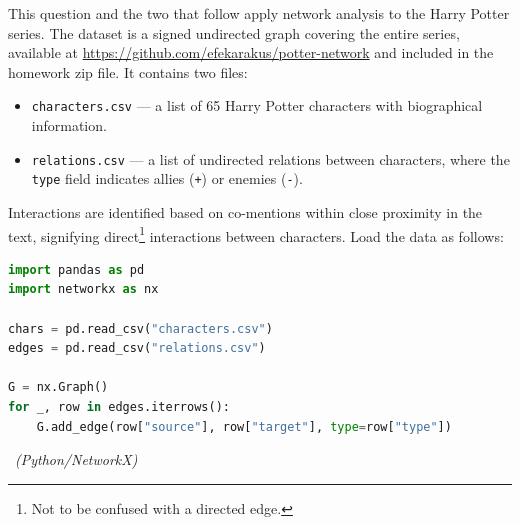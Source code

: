 \documentclass[11pt]{exam}
\begin{document}
\begin{questions}
This question and the two that follow apply network analysis to the Harry Potter
series. The dataset is a signed undirected graph covering the entire series,
available at \url{https://github.com/efekarakus/potter-network} and included in
the homework zip file. It contains two files:
\begin{itemize}
  \item \texttt{characters.csv} --- a list of 65 Harry Potter characters with
        biographical information.
  \item \texttt{relations.csv} --- a list of undirected relations between characters,
        where the \texttt{type} field indicates allies (\texttt{+}) or
        enemies (\texttt{-}).
\end{itemize}
Interactions are identified based on co-mentions within close proximity in the
text, signifying direct\footnote{Not to be confused with a directed edge.}
interactions between characters. Load the data as follows:
\begin{lstlisting}[language=Python]
import pandas as pd
import networkx as nx

chars = pd.read_csv("characters.csv")
edges = pd.read_csv("relations.csv")

G = nx.Graph()
for _, row in edges.iterrows():
    G.add_edge(row["source"], row["target"], type=row["type"])
\end{lstlisting}


~{\it (Python/NetworkX)}

\begin{parts}

\end{parts}
\end{questions}
\end{document}
